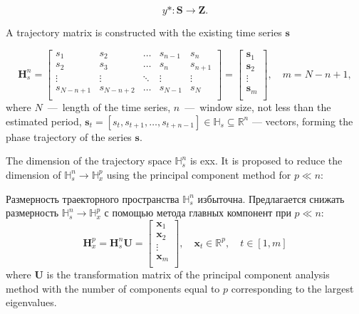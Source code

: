 \documentclass[12pt,twoside]{article}
\begin{document}
\begin{equation}
y*:\mathbf{S} \xrightarrow{} \mathbf{Z}.
\label{eq:y*}
\end{equation}

A trajectory matrix is constructed with the existing time series $\mathbf{s}$

\begin{equation*}
    \mathbf{H}_{s}^{n} = 
    \begin{bmatrix} 
    	s_{1} & s_{2} & \ldots &s_{n-1} &s_{n}\\
    	s_{2} & s_{3} & \ldots &s_{n} &s_{n+1}\\
    	\vdots& \vdots & \ddots & \vdots & \vdots\\
    	s_{N-n+1} & s_{N-n+2} &\ldots&s_{N-1} &s_{N}\\
    \end{bmatrix} = 
	\begin{bmatrix} 
      	\mathbf{s}_{1}\\
      	\mathbf{s}_{2}\\
      	\vdots\\
      	\mathbf{s}_{m}\\
   \end{bmatrix},
   \quad
   m = N-n+1,
\label{eq:hankel_matrix}
\end{equation*}
where $N$~---~length of the time series, $n$~---~window size, not less than the estimated period, $\mathbf{s}_t=[s_{t},s_{t+1},\ldots,s_{t+n-1}] \in \mathbb{H}_{s} \subseteq \mathbb{R}^{n}$ --- vectors, forming the phase trajectory of the series $\mathbf{s}$.

The dimension of the trajectory space $\mathbb{H}_{s}^{n}$ is exx.
It is proposed to reduce the dimension of $\mathbb{H}_{s}^{n} \xrightarrow{} \mathbb{H}_{x}^{p}$ using the principal component method for $p \ll n $:

Размерность траекторного пространства $\mathbb{H}_{s}^{n}$ избыточна.
Предлагается снижать размерность $\mathbb{H}_{s}^{n} \xrightarrow{} \mathbb{H}_{x}^{p}$ с помощью метода главных компонент при $p \ll n $:
\begin{equation}
\mathbf{H}_{x}^{p} = \mathbf{H}_{s}^{n}\mathbf{U} =
\begin{bmatrix} 
  	\mathbf{x}_{1}\\
  	\mathbf{x}_{2}\\
  	\vdots\\
  	\mathbf{x}_{m}\\
\end{bmatrix},
\quad
\mathbf{x}_{t} \in \mathbb{R}^{p},
\quad
t \in [1,m]
\label{eq:PCA}
\end{equation}
where $\mathbf{U}$ is the transformation matrix of the principal component analysis method with the number of components equal to $p$ corresponding to the largest eigenvalues.
\end{document}
